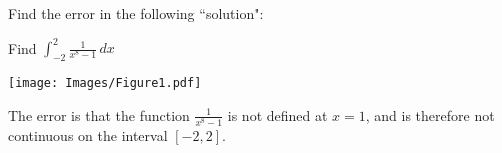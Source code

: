 \documentclass[nooutcomes]{ximera}
\renewenvironment{freeResponse}{
\ifhandout\setbox0\vbox\bgroup\else
\begin{trivlist}\item[\hskip \labelsep\bfseries Solution:\hspace{2ex}]
\fi}
{\ifhandout\egroup\else
\end{trivlist}
\fi}
\renewcommand{\d}{\,d}
\begin{document}
\begin{problem}
Find the error in the following ``solution":

Find $\int_{-2}^2 \frac{1}{x^8 - 1} \d x$

	\begin{image}
	\texttt{[image: Images/Figure1.pdf]}
	\end{image}

	\begin{freeResponse}
	The error is that the function $\frac{1}{x^8-1}$ is not defined at $x=1$, and is therefore not continuous on the interval $[-2,2]$.
	\end{freeResponse}
\end{problem}
\end{document}
